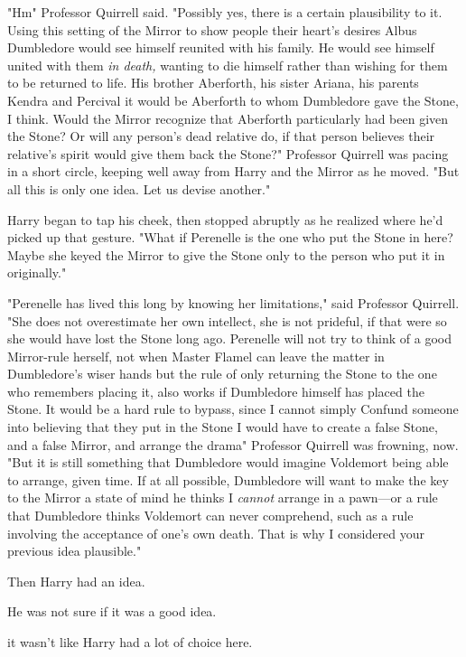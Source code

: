 "Hm{\el}" Professor Quirrell said. "Possibly{\el} yes, there is a certain
plausibility to it. Using this setting of the Mirror to show people their
heart's desires{\el} Albus Dumbledore would see himself reunited with his
family. He would see himself united with them \emph{in death,} wanting to die
himself rather than wishing for them to be returned to life. His brother
Aberforth, his sister Ariana, his parents Kendra and Percival{\el} it would
be Aberforth to whom Dumbledore gave the Stone, I think. Would the Mirror
recognize that Aberforth particularly had been given the Stone? Or will any
person's dead relative do, if that person believes their relative's spirit
would give them back the Stone?" Professor Quirrell was pacing in a short
circle, keeping well away from Harry and the Mirror as he moved. "But all this
is only one idea. Let us devise another."

Harry began to tap his cheek, then stopped abruptly as he realized where he'd
picked up that gesture. "What if Perenelle is the one who put the Stone in
here? Maybe she keyed the Mirror to give the Stone only to the person who put
it in originally."

"Perenelle has lived this long by knowing her limitations," said Professor
Quirrell. "She does not overestimate her own intellect, she is not prideful, if
that were so she would have lost the Stone long ago. Perenelle will not try to
think of a good Mirror-rule herself, not when Master Flamel can leave the
matter in Dumbledore's wiser hands{\el} but the rule of only returning the
Stone to the one who remembers placing it, also works if Dumbledore himself has
placed the Stone. It would be a hard rule to bypass, since I cannot simply
Confund someone into believing that they put in the Stone{\el} I would have
to create a false Stone, and a false Mirror, and arrange the drama{\el}"
Professor Quirrell was frowning, now. "But it is still something that
Dumbledore would imagine Voldemort being able to arrange, given time. If at all
possible, Dumbledore will want to make the key to the Mirror a state of mind he
thinks I \emph{cannot} arrange in a pawn---or a rule that Dumbledore thinks
Voldemort can never comprehend, such as a rule involving the acceptance of
one's own death. That is why I considered your previous idea plausible."

Then Harry had an idea.

He was not sure if it was a good idea.

{\el} it wasn't like Harry had a lot of choice here.


